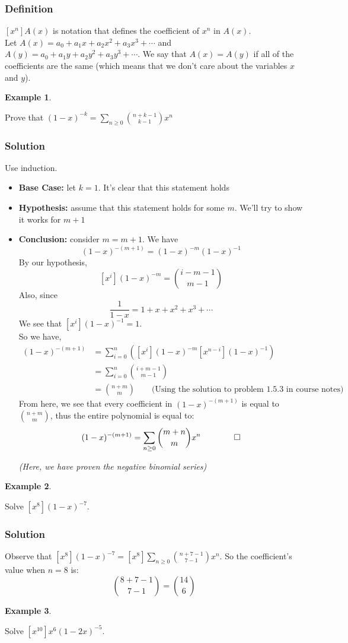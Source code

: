\documentclass{report}
\newtheorem{ex}{Example}[section]
\begin{document}
\subsubsection{Definition}
$[x^n]A(x)$ is notation that defines the coefficient of $x^n$ in $A(x)$.\\
Let $A(x) = a_0 + a_1x + a_2x^2 + a_3x^3 + \cdots$ and $A(y) = a_0 + a_1y + a_2y^2 + a_3y^3 + \cdots$. We say that $A(x) = A(y)$ if all of the coefficients are the same (which means that we don't care about the variables $x$ and $y$).
\begin{ex}
\end{ex}
Prove that $(1-x)^{-k} = \displaystyle\sum_{n \geq 0} {n+k-1 \choose k-1}x^n$
\subsubsection{Solution}
Use induction.
\begin{itemize}
\item \textbf{Base Case:} let $k=1$. It's clear that this statement holds
\item \textbf{Hypothesis:} assume that this statement holds for some $m$. We'll try to show it works for $m+1$
\item \textbf{Conclusion:} consider $m = m+1$. We have
$$(1-x)^{-(m+1)} = (1-x)^{-m}(1-x)^{-1}$$
By our hypothesis,
$$[x^i](1-x)^{-m} = {i - m - 1 \choose m-1}$$
Also, since
$$\frac{1}{1-x} = 1 + x + x^2 + x^3 + \cdots$$
We see that $[x^i](1-x)^{-1} = 1$.\\
So we have,
\begin{align*}
[x^n](1-x)^{-(m+1)} &= \sum_{i=0}^n ([x^i](1-x)^{-m}[x^{n-i}](1-x)^{-1})\\
&= \sum_{i=0}^n {i + m - 1 \choose m - 1}\\
&= {n + m \choose m} \qquad \text{(Using the solution to problem 1.5.3 in course notes)}
\end{align*}
From here, we see that every coefficient in $(1-x)^{-(m+1)}$ is equal to ${n+m \choose m}$, thus the entire polynomial is equal to:
$$(1-x)^{-(m+1)} = \sum_{n \geq 0} {m+n \choose m} x^n \qquad \qed$$
\begin{center}
\textit{(Here, we have proven the negative binomial series)}
\end{center}\newpage
\end{itemize}
\begin{ex}
\end{ex}
Solve $[x^8](1-x)^{-7}$.
\subsubsection{Solution}
Observe that $[x^8](1-x)^{-7} = [x^8]\displaystyle\sum_{n \geq 0} {n+7-1 \choose 7-1}x^n$. So the coefficient's value when $n=8$ is:
$${8+7-1 \choose 7-1} = {14 \choose 6}$$
\begin{ex}
\end{ex}
Solve $[x^{10}]x^6(1-2x)^{-5}$.
\end{document}
